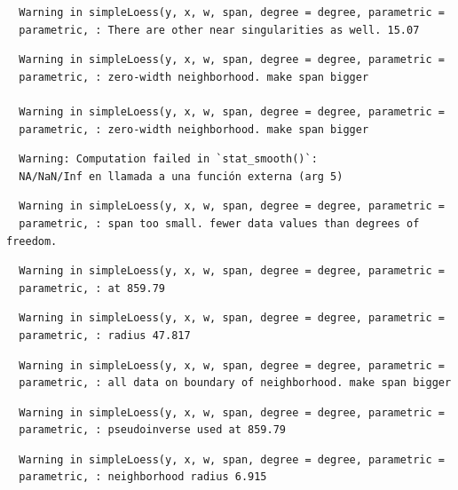 \documentclass[12pt,twoside]{reedthesis}
\begin{document}
  \begin{verbatim}
  Warning in simpleLoess(y, x, w, span, degree = degree, parametric =
  parametric, : There are other near singularities as well. 15.07
  \end{verbatim}
  
  \begin{verbatim}
  Warning in simpleLoess(y, x, w, span, degree = degree, parametric =
  parametric, : zero-width neighborhood. make span bigger
  
  Warning in simpleLoess(y, x, w, span, degree = degree, parametric =
  parametric, : zero-width neighborhood. make span bigger
  \end{verbatim}
  
  \begin{verbatim}
  Warning: Computation failed in `stat_smooth()`:
  NA/NaN/Inf en llamada a una función externa (arg 5)
  \end{verbatim}
  
  \begin{verbatim}
  Warning in simpleLoess(y, x, w, span, degree = degree, parametric =
  parametric, : span too small. fewer data values than degrees of freedom.
  \end{verbatim}
  
  \begin{verbatim}
  Warning in simpleLoess(y, x, w, span, degree = degree, parametric =
  parametric, : at 859.79
  \end{verbatim}
  
  \begin{verbatim}
  Warning in simpleLoess(y, x, w, span, degree = degree, parametric =
  parametric, : radius 47.817
  \end{verbatim}
  
  \begin{verbatim}
  Warning in simpleLoess(y, x, w, span, degree = degree, parametric =
  parametric, : all data on boundary of neighborhood. make span bigger
  \end{verbatim}
  
  \begin{verbatim}
  Warning in simpleLoess(y, x, w, span, degree = degree, parametric =
  parametric, : pseudoinverse used at 859.79
  \end{verbatim}
  
  \begin{verbatim}
  Warning in simpleLoess(y, x, w, span, degree = degree, parametric =
  parametric, : neighborhood radius 6.915
  \end{verbatim}
  
\end{document}
